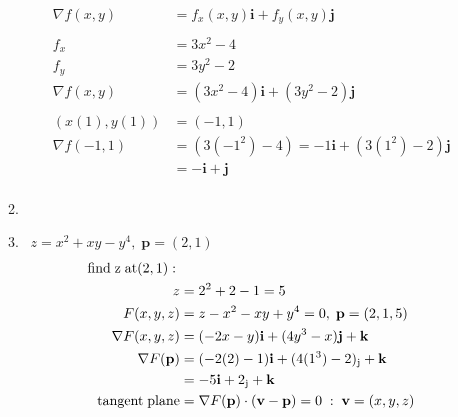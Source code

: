 \documentclass[11pt]{article}
\newcommand\Item[1][]{%
  \ifx\relax#1\relax  \item \else \item[#1] \fi
  \abovedisplayskip=0pt\abovedisplayshortskip=0pt~\vspace*{-\baselineskip}}
\begin{document}
\begin{preview}
\begin{enumerate}
\begin{enumerate}
                  \begin{align*}
                      \nabla f(x,y)  & = f_{x}(x,y)\textbf{i} + f_{y}(x,y)\textbf{j}         \\\\
                      f_{x}          & = 3x^{2} - 4                                          \\
                      f_{y}          & = 3y^{2} - 2                                          \\
                      \nabla f(x,y)  & = (3x^{2} - 4)\textbf{i} + (3y^{2} - 2)\textbf{j}     \\\\
                      (x(1), y(1))   & = (-1, 1)                                             \\
                      \nabla f(-1,1) & = (3(-1^2) - 4)=-1\textbf{i} + (3(1^2) - 2)\textbf{j} \\
                                     & = -\textbf{i} + \textbf{j}                            \\
                  \end{align*}
                  \Item $z = x^2 + xy - y^4, \; \textbf{p} = (2,1)$ \\
                  \begin{align*}
                      \mathrm{find \; z \; at (2,1): \;} &                                                                                       \\
                      z                                  & = 2^2 + 2 - 1 = 5                                                                     \\
                      F(x,y,z)                           & = z - x^2 - xy + y^4 = 0, \; \textbf{p} = (2,1,5)                                     \\
                      \nabla F(x,y,z)                    & = (-2x - y)\textbf{i} + (4y^3 - x)\textbf{j} + \textbf{k}                             \\
                      \nabla F(\textbf{p})               & = (-2(2) - 1)\textbf{i} + (4(1^3) - 2)\textsubscript{j} + \textbf{k}                  \\
                                                         & = -5\textbf{i} + 2\textsubscript{j} + \textbf{k}                                      \\
                      \mathrm{tangent \; plane}          & = \nabla F(\textbf{p}) \cdot (\textbf{v} - \textbf{p}) = 0 \; : \; \textbf{v}=(x,y,z) \\

\end{align*}
\end{enumerate}
\end{enumerate}
\end{preview}
\end{document}
